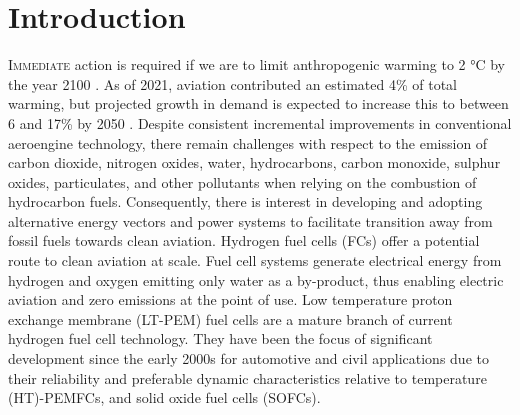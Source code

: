\section{Introduction}

\lettrine{I}{mmediate} action is required if we are to limit anthropogenic warming to 2 °C by the year 2100 \cite{environment_emissions_2024}.
As of 2021, aviation contributed an estimated 4\% of total warming, but projected growth in demand is expected to increase this to between 6 and 17\% by 2050 \cite{klower_quantifying_2021}.
Despite consistent incremental improvements in conventional aeroengine technology, there remain challenges with respect to the emission of carbon dioxide, nitrogen oxides, water, hydrocarbons, carbon monoxide, sulphur oxides, particulates, and other pollutants when relying on the combustion of hydrocarbon fuels.
Consequently, there is interest in developing and adopting alternative energy vectors and power systems to facilitate transition away from fossil fuels towards clean aviation.
Hydrogen fuel cells (FCs) offer a potential route to clean aviation at scale.
Fuel cell systems generate electrical energy from hydrogen and oxygen emitting only water as a by-product, thus enabling electric aviation and zero emissions at the point of use.
Low temperature proton exchange membrane (LT-PEM) fuel cells are a mature branch of current hydrogen fuel cell technology. They have been the focus of significant development since the early 2000s for automotive and civil applications due to their reliability and preferable dynamic characteristics relative to temperature (HT)-PEMFCs, and solid oxide fuel cells (SOFCs).

